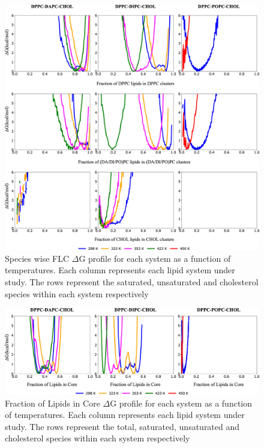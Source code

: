 \documentclass[10pt]{article}
\begin{document}
\begin{figure}[H]
    \centering
    \includegraphics[width=6.5in]{Figures/Supplementary/AVs/SpeciesWiseFLC/placeholder.jpg}
    \caption{Species wise FLC $\Delta$G profile for each system as a function of temperatures. Each column represents each lipid system under study. The rows represent the saturated, unsaturated and cholesterol species within each system respectively}
    \label{figs3:view}
\end{figure}

\begin{figure}[H]
    \centering
    \includegraphics[width=6.5in]{Figures/Supplementary/AVs/FLCore/placeholder.jpg}
    \caption{Fraction of Lipids in Core $\Delta$G profile for each system as a function of temperatures. Each column represents each lipid system under study. The rows represent the total, saturated, unsaturated and cholesterol species within each system respectively}
    \label{figs4:view}
\end{figure}
\end{document}
